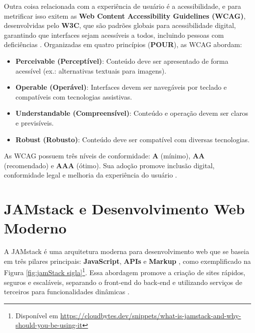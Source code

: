 Outra coisa relacionada com a experiência de usuário é a acessibilidade, e para metrificar isso exitem as \textbf{Web Content Accessibility Guidelines (WCAG)}, desenvolvidas pelo \textbf{W3C}, que são padrões globais para acessibilidade digital, garantindo que interfaces sejam acessíveis a todos, incluindo pessoas com deficiências \citep{wcag21}. Organizadas em quatro princípios (\textbf{POUR}), as WCAG abordam:

\begin{itemize}
    \item \textbf{Perceivable (Perceptível)}: Conteúdo deve ser apresentado de forma acessível (ex.: alternativas textuais para imagens).
    \item \textbf{Operable (Operável)}: Interfaces devem ser navegáveis por teclado e compatíveis com tecnologias assistivas.
    \item \textbf{Understandable (Compreensível)}: Conteúdo e operação devem ser claros e previsíveis.
    \item \textbf{Robust (Robusto)}: Conteúdo deve ser compatível com diversas tecnologias.
\end{itemize}

As WCAG possuem três níveis de conformidade: \textbf{A} (mínimo), \textbf{AA} (recomendado) e \textbf{AAA} (ótimo). Sua adoção promove inclusão digital, conformidade legal e melhoria da experiência do usuário \citep{wcag21}.



\section{JAMstack e Desenvolvimento Web Moderno}
\label{sec:jamstack}
A JAMstack é uma arquitetura moderna para desenvolvimento web que se baseia em três pilares principais: \textbf{JavaScript}, \textbf{APIs} e \textbf{Markup} \citep{jamstackorg}, como exemplificado na Figura \ref{fig:jamStack sigla}\footnote{Disponível em \href{https://cloudbytes.dev/snippets/what-is-jamstack-and-why-should-you-be-using-it}{https://cloudbytes.dev/snippets/what-is-jamstack-and-why-should-you-be-using-it}}. Essa abordagem promove a criação de sites rápidos, seguros e escaláveis, separando o front-end do back-end e utilizando serviços de terceiros para funcionalidades dinâmicas \citep{netlifyjamstack}.

